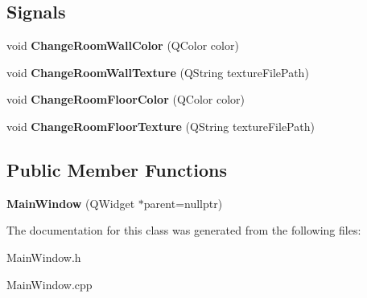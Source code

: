 \subsection*{Signals}
\begin{DoxyCompactItemize}
\item 
\hypertarget{class_main_window_a5a43372ffcce6aae9bb86d5b416854e1}{}void {\bfseries Change\+Room\+Wall\+Color} (Q\+Color color)\label{class_main_window_a5a43372ffcce6aae9bb86d5b416854e1}

\item 
\hypertarget{class_main_window_af86ec5a624baa391275a7b56e2729187}{}void {\bfseries Change\+Room\+Wall\+Texture} (Q\+String texture\+File\+Path)\label{class_main_window_af86ec5a624baa391275a7b56e2729187}

\item 
\hypertarget{class_main_window_a541dbc413da170b85d675b40dea1c049}{}void {\bfseries Change\+Room\+Floor\+Color} (Q\+Color color)\label{class_main_window_a541dbc413da170b85d675b40dea1c049}

\item 
\hypertarget{class_main_window_a4f913649fd4c09474b369faa60967d3b}{}void {\bfseries Change\+Room\+Floor\+Texture} (Q\+String texture\+File\+Path)\label{class_main_window_a4f913649fd4c09474b369faa60967d3b}

\end{DoxyCompactItemize}
\subsection*{Public Member Functions}
\begin{DoxyCompactItemize}
\item 
\hypertarget{class_main_window_a996c5a2b6f77944776856f08ec30858d}{}{\bfseries Main\+Window} (Q\+Widget $\ast$parent=nullptr)\label{class_main_window_a996c5a2b6f77944776856f08ec30858d}

\end{DoxyCompactItemize}


The documentation for this class was generated from the following files\+:\begin{DoxyCompactItemize}
\item 
Main\+Window.\+h\item 
Main\+Window.\+cpp\end{DoxyCompactItemize}
